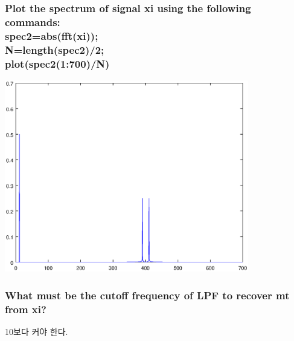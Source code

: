 \documentclass[12pt,a4paper]{article}
\begin{document}
\subsubsection{Plot the spectrum of signal xi using the following commands:\\spec2=abs(fft(xi));\\N=length(spec2)/2;\\plot(spec2(1:700)/N)}          
\includegraphics[width=0.8\textwidth]{2f.eps}

\subsubsection{What must be the cutoff frequency of LPF to recover mt from xi?} 
10보다 커야 한다.
\end{document}
